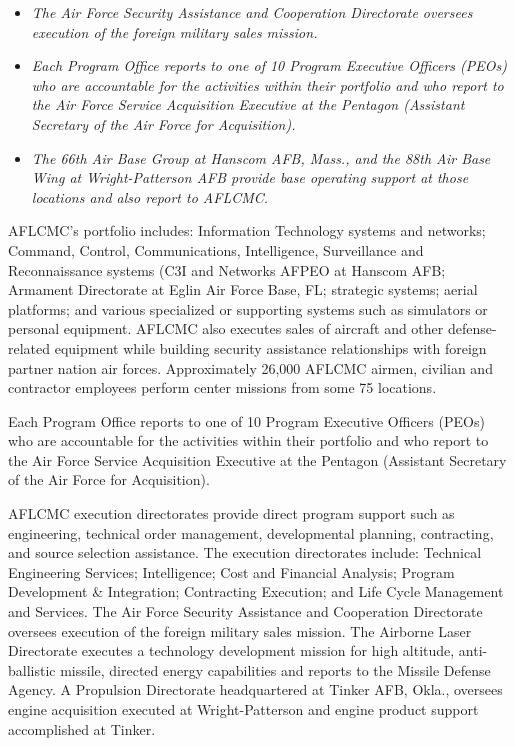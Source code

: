 \begin{itemize}
\item
  \emph{The Air Force Security Assistance and Cooperation Directorate
  oversees execution of the foreign military sales mission.}
\item
  \emph{Each Program Office reports to one of 10 Program Executive
  Officers (PEOs) who are accountable for the activities within their
  portfolio and who report to the Air Force Service Acquisition
  Executive at the Pentagon (Assistant Secretary of the Air Force for
  Acquisition).}
\item
  \emph{The 66th Air Base Group at Hanscom AFB, Mass., and the 88th Air
  Base Wing at Wright-Patterson AFB provide base operating support at
  those locations and also report to AFLCMC.}
\end{itemize}

AFLCMC's portfolio includes: Information Technology systems and
networks; Command, Control, Communications, Intelligence, Surveillance
and Reconnaissance systems (C3I and Networks AFPEO at Hanscom AFB;
Armament Directorate at Eglin Air Force Base, FL; strategic systems;
aerial platforms; and various specialized or supporting systems such as
simulators or personal equipment. AFLCMC also executes sales of aircraft
and other defense-related equipment while building security assistance
relationships with foreign partner nation air forces. Approximately
26,000 AFLCMC airmen, civilian and contractor employees perform center
missions from some 75 locations.

Each Program Office reports to one of 10 Program Executive Officers
(PEOs) who are accountable for the activities within their portfolio and
who report to the Air Force Service Acquisition Executive at the
Pentagon (Assistant Secretary of the Air Force for Acquisition).

AFLCMC execution directorates provide direct program support such as
engineering, technical order management, developmental planning,
contracting, and source selection assistance. The execution directorates
include: Technical Engineering Services; Intelligence; Cost and
Financial Analysis; Program Development \& Integration; Contracting
Execution; and Life Cycle Management and Services. The Air Force
Security Assistance and Cooperation Directorate oversees execution of
the foreign military sales mission. The Airborne Laser Directorate
executes a technology development mission for high altitude,
anti-ballistic missile, directed energy capabilities and reports to the
Missile Defense Agency. A Propulsion Directorate headquartered at Tinker
AFB, Okla., oversees engine acquisition executed at Wright-Patterson and
engine product support accomplished at Tinker.

